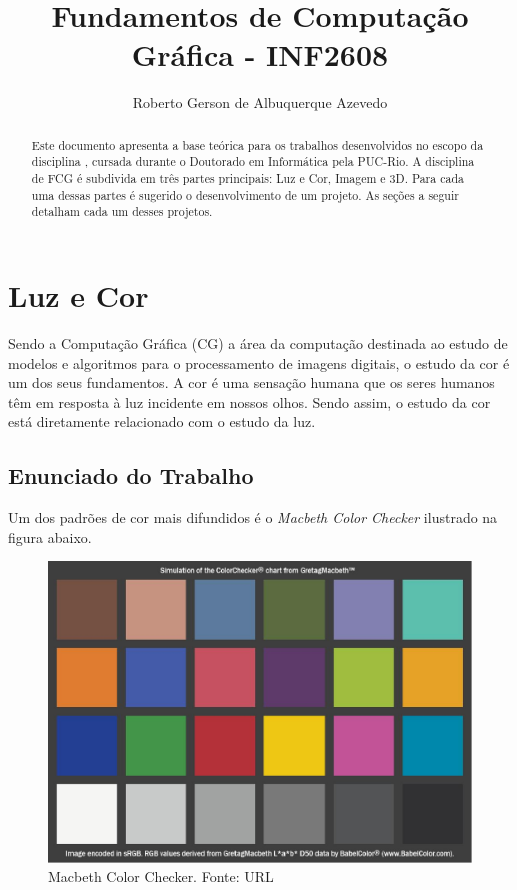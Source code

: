 \documentclass[a4paper,10pt]{report}
\title{Fundamentos de Computação Gráfica - INF2608}
\author{Roberto Gerson de Albuquerque Azevedo}
\begin{document}
\maketitle

\begin{abstract}
Este documento apresenta a base teórica para os trabalhos desenvolvidos no
escopo da disciplina , cursada
durante o Doutorado em Informática pela PUC-Rio. A disciplina de FCG é subdivida
em três partes principais: Luz e Cor, Imagem e 3D. Para cada uma dessas partes é
sugerido o desenvolvimento de um projeto. As seções a seguir detalham cada um
desses projetos.
\end{abstract}

\chapter{Luz e Cor}
\par
Sendo a Computação Gráfica (CG) a área da computação destinada ao estudo de
modelos e algoritmos para o processamento de imagens digitais, o estudo da cor é
um dos seus fundamentos. A cor é uma sensação humana que os seres humanos têm
em resposta à luz incidente em nossos olhos. Sendo assim, o estudo da cor está
diretamente relacionado com o estudo da luz.

\par


\section{Enunciado do Trabalho}
\par
Um dos padrões de cor mais difundidos é o \textit{Macbeth Color Checker}
ilustrado na figura abaixo.

\begin{figure}[!htb]
     \centering
     \includegraphics[scale=0.4]{img/colorChecker.jpg}
     \caption{Macbeth Color Checker. Fonte: URL}
     \label{Label de referência para a imagem}
\end{figure}
\end{document}
